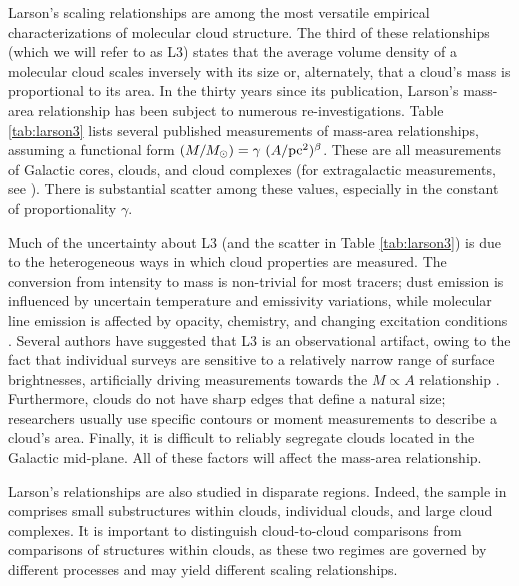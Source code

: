 Larson's scaling relationships \citep{Larson81} are among the most versatile empirical characterizations of molecular cloud structure. The third of these relationships (which we will refer to as L3) states that the average volume density of a molecular cloud scales inversely with its size or, alternately, that a cloud's mass is proportional to its area.  In the thirty years since its publication, Larson's mass-area relationship has been subject to numerous re-investigations. Table \ref{tab:larson3} lists several published measurements of mass-area relationships, assuming a functional form $(M/M_\odot) = \gamma ~(A/{\rm pc^2})^\beta$. These are all measurements of Galactic cores, clouds, and cloud complexes (for extragalactic measurements, see \citealt{Bolatto08, Hughes10}). There is substantial scatter among these values, especially in the constant of proportionality $\gamma$.


Much of the uncertainty about L3 (and the scatter in Table \ref{tab:larson3}) is due to the heterogeneous ways in which cloud properties are measured. The conversion from intensity to mass is non-trivial for most tracers; dust emission is influenced by uncertain temperature and emissivity variations, while molecular line emission is affected by opacity, chemistry, and changing excitation conditions \citep{Goodman09}. Several authors have suggested that L3 is an observational artifact, owing to the fact that individual surveys are sensitive to a relatively narrow range of surface brightnesses, artificially driving measurements towards the $M \propto A$ relationship \citep{Kegel89, Ballesteros02}. Furthermore, clouds do not have sharp edges that define a natural size; researchers usually use specific contours or moment measurements to describe a cloud's area. Finally, it is difficult to reliably segregate clouds located in the Galactic mid-plane. All of these factors will affect the mass-area relationship.

Larson's relationships are also studied in disparate regions. Indeed, the sample in \cite{Larson81} comprises small substructures within clouds, individual clouds, and large cloud complexes. It is important to distinguish cloud-to-cloud comparisons from comparisons of structures within clouds, as these two regimes are governed by different processes and may yield different scaling relationships.

